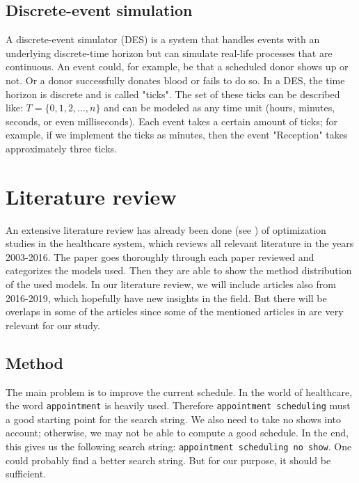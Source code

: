\documentclass[a4paper,12pt]{article}
\begin{document}
\subsection{Discrete-event simulation}
A discrete-event simulator (DES) is a system that handles events with an underlying discrete-time horizon but can simulate real-life processes that are continuous. An event could, for example, be that a scheduled donor shows up or not. Or a donor successfully donates blood or fails to do so. In a DES, the time horizon is discrete and is called "ticks". The set of these ticks can be described like: $T=\{0,1,2,...,n\}$ and can be modeled as any time unit (hours, minutes, seconds, or even milliseconds). Each event takes a certain amount of ticks; for example, if we implement the ticks as minutes, then the event "Reception" takes approximately three ticks. 




\section{Literature review}

An extensive literature review has already been done (see \cite{BD32}) of optimization studies in the healthcare system, which reviews all relevant literature in the years 2003-2016. The paper goes thoroughly through each paper reviewed and categorizes the models used. Then they are able to show the method distribution of the used models. In our literature review, we will include articles also from 2016-2019, which hopefully have new insights in the field. But there will be overlaps in some of the articles since some of the mentioned articles in \cite{BD32} are very relevant for our study.

\bigbreak

\subsection{Method}

The main problem is to improve the current schedule. In the world of healthcare, the word \texttt{appointment} is heavily used. Therefore \texttt{appointment scheduling} must a good starting point for the search string. We also need to take no shows into account; otherwise, we may not be able to compute a good schedule. In the end, this gives us the following search string: \texttt{appointment scheduling no show}. One could probably find a better search string. But for our purpose, it should be sufficient.
\end{document}
